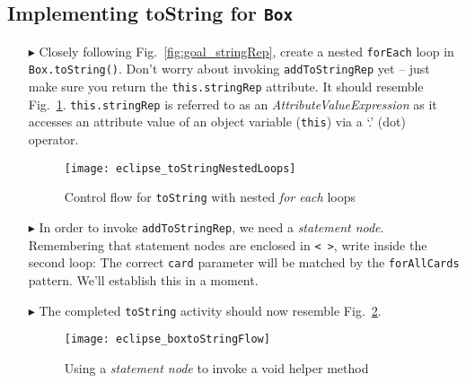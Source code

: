 \newpage
\hypertarget{stringRep tex}{}
\subsection{Implementing toString for \texttt{Box}}
\texHeader

\vspace{0.5cm}

\begin{itemize}
  
\item[$\blacktriangleright$] Closely following Fig.~\ref{fig:goal_stringRep}, create a nested \texttt{forEach} loop in \texttt{Box.toString()}.
Don't worry about invoking \texttt{addToStringRep} yet -- just make sure you return the \texttt{this.stringRep} attribute. It should resemble
Fig.~\ref{fig:emptyLoops}. \texttt{this.stringRep} is referred to as an \emph{AttributeValueExpression} as it accesses an
attribute value of an object variable (\texttt{this}) via a `.' (dot) operator.

\begin{figure}[htp]
\begin{center}
  \texttt{[image: eclipse\_toStringNestedLoops]}
  \caption{Control flow for \texttt{toString} with nested \emph{for each} loops}
  \label{fig:emptyLoops}
\end{center}
\end{figure}

\item[$\blacktriangleright$] In order to invoke \texttt{addToStringRep}, we need a \emph{statement node}. Remembering that statement nodes are enclosed in
\texttt{< >}, write inside the second loop:  
The correct \texttt{card} parameter will be matched by the \texttt{forAllCards} pattern. We'll establish this in a moment.

\vspace{0.5cm}

\item[$\blacktriangleright$] The completed \texttt{toString} activity should now resemble Fig.~\ref{fig:toStringFlow}.

\vspace{0.5cm}

\begin{figure}[htp]
\begin{center}
  \texttt{[image: eclipse\_boxtoStringFlow]}
  \caption{Using a \emph{statement node} to invoke a void helper method}
  \label{fig:toStringFlow}
\end{center}
\end{figure}


\end{itemize}

